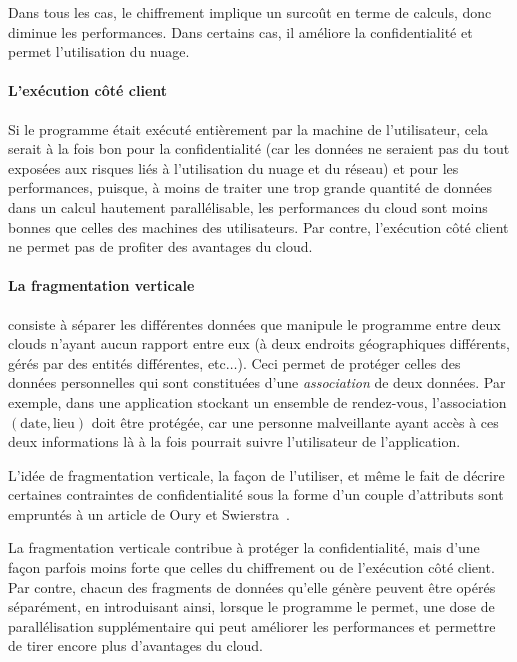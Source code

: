 Dans tous les cas, le chiffrement implique un surcoût en terme de calculs,
donc diminue les performances. Dans certains cas, il améliore la confidentialité
et permet l'utilisation du nuage.

\paragraph{L'exécution côté client}
Si le programme était exécuté entièrement par la machine de l'utilisateur,
cela serait à la fois bon pour la confidentialité (car les données
ne seraient pas du tout exposées aux risques liés à l'utilisation du nuage
et du réseau) et pour les performances, puisque, à moins de traiter une 
trop grande quantité de données dans un calcul hautement parallélisable,
les performances du cloud sont moins bonnes que celles des machines des utilisateurs.
Par contre, l'exécution côté client ne permet pas de profiter des avantages du cloud.

\paragraph{La fragmentation verticale} consiste à séparer les différentes données
que manipule le programme entre deux clouds n'ayant aucun rapport entre eux
(à deux endroits géographiques différents, gérés par des entités différentes,
etc$\dots$).
Ceci permet de protéger celles des données personnelles qui sont constituées d'une
\emph{association} de deux données. Par exemple, dans une application stockant
un ensemble de rendez-vous, l'association $(\mathrm{date}, \mathrm{lieu})$
doit être protégée, car une personne malveillante ayant accès à ces deux
informations là à la fois pourrait suivre l'utilisateur de l'application.

L'idée de fragmentation verticale, la façon de l'utiliser,
et même le fait de décrire certaines contraintes de
confidentialité sous la forme d'un couple d'attributs
sont empruntés à un article de 
Oury et Swierstra~\cite{OurySwierstra}.

La fragmentation verticale contribue à protéger la confidentialité,
mais d'une façon parfois moins forte que celles du chiffrement
ou de l'exécution côté client. Par contre, chacun des fragments
de données qu'elle génère peuvent être opérés séparément, en introduisant
ainsi, lorsque le programme le permet, une dose de parallélisation
supplémentaire qui peut améliorer les performances et permettre de tirer
encore plus d'avantages du cloud.

